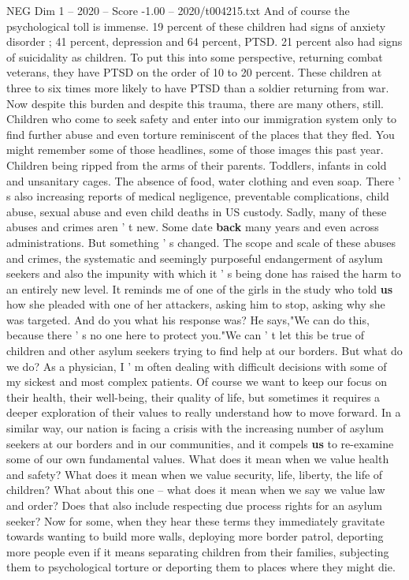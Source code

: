 \begin{textsample}{NEG Dim 1 – 2020 – Score -1.00 – 2020/t004215.txt}
And of course the psychological toll is immense. 19 percent of these children had signs of anxiety disorder ; 41 percent, depression and 64 percent, PTSD. 21 percent also had signs of suicidality as children.
To put this into some perspective, returning combat veterans, they have PTSD on the order of 10 to 20 percent.
These children at three to six times more likely to have PTSD than a soldier returning from war.
Now despite this burden and despite this trauma, there are many others, still.
Children who come to seek safety and enter into our immigration system only to find further abuse and even torture reminiscent of the places that they fled.
You might remember some of those headlines, some of those images this past year.
Children being ripped from the arms of their parents.
Toddlers, infants in cold and unsanitary cages.
The absence of food, water clothing and even soap.
There ' s also increasing reports of medical negligence, preventable complications, child abuse, sexual abuse and even child deaths in US custody.
Sadly, many of these abuses and crimes aren ' t new.
Some date \textbf{back} many years and even across administrations.
But something ' s changed.
The scope and scale of these abuses and crimes, the systematic and seemingly purposeful endangerment of asylum seekers and also the impunity with which it ' s being done has raised the harm to an entirely new level.
It reminds me of one of the girls in the study who told \textbf{us} how she pleaded with one of her attackers, asking him to stop, asking why she was targeted.
And do you what his response was?
He says,"We can do this, because there ' s no one here to protect you."We can ' t let this be true of children and other asylum seekers trying to find help at our borders.
But what do we do?
As a physician, I ' m often dealing with difficult decisions with some of my sickest and most complex patients.
Of course we want to keep our focus on their health, their well-being, their quality of life, but sometimes it requires a deeper exploration of their values to really understand how to move forward.
In a similar way, our nation is facing a crisis with the increasing number of asylum seekers at our borders and in our communities, and it compels \textbf{us} to re-examine some of our own fundamental values.
What does it mean when we value health and safety?
What does it mean when we value security, life, liberty, the life of children?
What about this one -- what does it mean when we say we value law and order?
Does that also include respecting due process rights for an asylum seeker?
Now for some, when they hear these terms they immediately gravitate towards wanting to build more walls, deploying more border patrol, deporting more people even if it means separating children from their families, subjecting them to psychological torture or deporting them to places where they might die.

\end{textsample}
